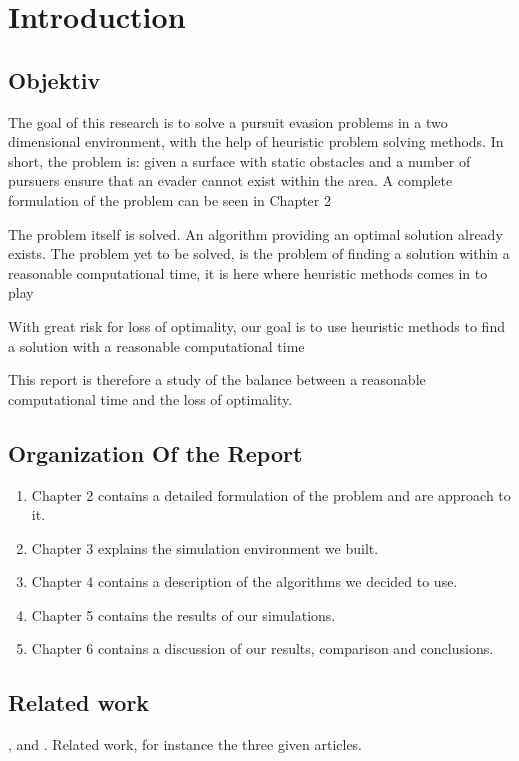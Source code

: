\chapter{Introduction}

\section{Objektiv}
The goal of this research is to solve a pursuit evasion problems in a two dimensional environment, with the help of heuristic problem solving methods.
In short, the problem is: given a surface with static obstacles and a number of pursuers ensure that an evader cannot exist within the area. A complete formulation of the problem can be seen in Chapter 2

The problem itself is solved. An algorithm providing an optimal solution already exists.
The problem yet to be solved, is the problem of finding a solution within a reasonable computational time, it is here where heuristic methods comes in to play

With great risk for loss of optimality, our goal is to use heuristic methods to find a solution with a reasonable computational time
 
This report is therefore a study of the balance between a reasonable computational time and the loss of optimality.

\section{Organization Of the Report}
\begin{enumerate}
\item Chapter 2 contains a detailed formulation of the problem and are approach to it.
\item Chapter 3 explains the simulation environment we built.
\item Chapter 4 contains a description of the algorithms we decided to use.
\item Chapter 5 contains the results of our simulations.
\item Chapter 6 contains a discussion of our results, comparison and conclusions.
\end{enumerate}

\section{ Related work}
\cite{paper1}, \cite{paper2} and \cite{paper3}.
Related work, for instance the three given articles.

